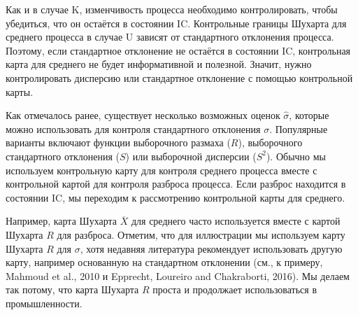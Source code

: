 Как и в случае K, изменчивость процесса необходимо контролировать, чтобы убедиться, что он остаётся в состоянии IC. Контрольные границы Шухарта для среднего процесса в случае U зависят от стандартного отклонения процесса. Поэтому, если стандартное отклонение не остаётся в состоянии IC, контрольная карта для среднего не будет информативной и полезной. Значит, нужно контролировать дисперсию или стандартное отклонение с помощью контрольной карты.

Как отмечалось ранее, существует несколько возможных оценок \(\hat{\sigma}\), которые можно использовать для контроля стандартного отклонения \(\sigma\). Популярные варианты включают функции выборочного размаха (\(R\)), выборочного стандартного отклонения (\(S\)) или выборочной дисперсии (\(S^2\)). Обычно мы используем контрольную карту для контроля среднего процесса вместе с контрольной картой для контроля разброса процесса. Если разброс находится в состоянии IC, мы переходим к рассмотрению контрольной карты для среднего.

Например, карта Шухарта \(\overline{X}\) для среднего часто используется вместе с картой Шухарта \(R\) для разброса. Отметим, что для иллюстрации мы используем карту Шухарта \(R\) для \(\sigma\), хотя недавняя литература рекомендует использовать другую карту, например основанную на стандартном отклонении (см., к примеру, Mahmoud et al., 2010 и Epprecht, Loureiro and Chakraborti, 2016). Мы делаем так потому, что карта Шухарта \(R\) проста и продолжает использоваться в промышленности.

